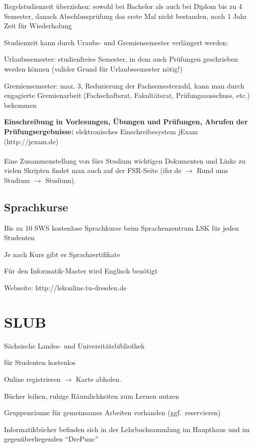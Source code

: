 \documentclass[a4paper,12pt]{report}
\begin{document}
\begin{itemize*}
    \item Regelstudienzeit überziehen: sowohl bei Bachelor als auch bei Diplom bis zu 4 Semester, danach Abschlussprüfung das erste Mal nicht bestanden, noch 1 Jahr Zeit für Wiederholung
    \item Studienzeit kann durch Uraubs- und Gremiensemester verlängert werden:
    \begin{itemize*}
        \item Urlaubssemester: studienfreies Semester, in dem auch Prüfungen geschrieben werden können (valider Grund für Urlaubssemester nötig!)
        \item Gremiensemester: max. 3, Reduzierung der Fachsemesterzahl, kann man durch engagierte Gremienarbeit (Fachschaftsrat, Fakultätsrat, Prüfungsausschuss, etc.) bekommen
    \end{itemize*}
\end{itemize*}

\textbf{Einschreibung in Vorlesungen, Übungen und Prüfungen, Abrufen der Prüfungsergebnisse: }elektronisches Einschreibesystem jExam (http://jexam.de)\\\\
Eine Zusammenstellung von fürs Studium wichtigen Dokumenten und Links zu vielen Skripten findet man auch auf der FSR-Seite (ifsr.de $\rightarrow$ Rund ums Studium $\rightarrow$ Studium).

\subsection{Sprachkurse}
\begin{itemize*}
\item Bis zu 10 SWS kostenlose Sprachkurse beim Sprachenzentrum LSK für jeden Studenten
\item Je nach Kurs gibt es Sprachzertifikate
\item Für den Informatik-Master wird Englisch benötigt
\item Webseite: http://lskonline.tu-dresden.de
\end{itemize*}

\section{SLUB}
\begin{itemize*}
    \item Sächsische Landes- und Universitätsbibliothek
    \item für Studenten kostenlos
    \item Online registrieren $\rightarrow$ Karte abholen.
    \item Bücher leihen, ruhige Räumlichkeiten zum Lernen nutzen
    \item Gruppenräume für gemeinsames Arbeiten vorhanden (ggf.\ reservieren)
    \item Informatikbücher befinden sich in der Lehrbuchsammlung im Haupthaus und im gegenüberliegenden \enquote{DrePunc}
\end{itemize*}
\end{document}
